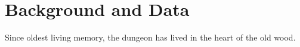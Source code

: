 \section{Background and Data}
Since oldest living memory, the dungeon has lived in the heart of the old wood.

